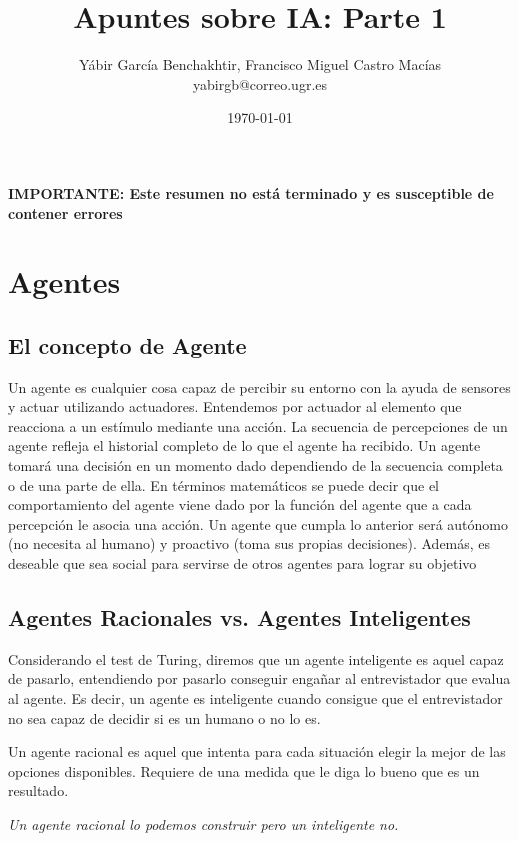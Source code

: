 \documentclass[12pt]{article}
\author{Yábir García Benchakhtir, Francisco Miguel Castro Macías\\yabirgb@correo.ugr.es}
\date{\today}
\title{Apuntes sobre IA: Parte 1}
\begin{document}
\setlength{\parindent}{0cm}
\setlength{\parskip}{3mm}

\maketitle

\textbf{IMPORTANTE: Este resumen no está terminado y es susceptible de contener errores}

\section{Agentes}

\subsection{El concepto de Agente}

Un agente es cualquier cosa capaz de percibir su entorno con la ayuda
de sensores y actuar utilizando actuadores. Entendemos por actuador al
elemento que reacciona a un estímulo mediante una acción.  La
secuencia de percepciones de un agente refleja el historial completo
de lo que el agente ha recibido. Un agente tomará una decisión en un
momento dado dependiendo de la secuencia completa o de una parte de
ella. En términos matemáticos se puede decir que el comportamiento del
agente viene dado por la función del agente que a cada percepción le
asocia una acción.  Un agente que cumpla lo anterior será autónomo (no
necesita al humano) y proactivo (toma sus propias decisiones). Además,
es deseable que sea social para servirse de otros agentes para lograr
su objetivo

\subsection{Agentes Racionales vs. Agentes Inteligentes}

Considerando el test de Turing, diremos que un agente inteligente es
aquel capaz de pasarlo, entendiendo por pasarlo conseguir engañar al
entrevistador que evalua al agente. Es decir, un agente es inteligente
cuando consigue que el entrevistador no sea capaz de decidir si es un
humano o no lo es.

Un agente racional es aquel que intenta para cada situación elegir la
mejor de las opciones disponibles. Requiere de una medida que le diga
lo bueno que es un resultado.

\textit{Un agente racional lo podemos construir pero un inteligente no.}
\end{document}
